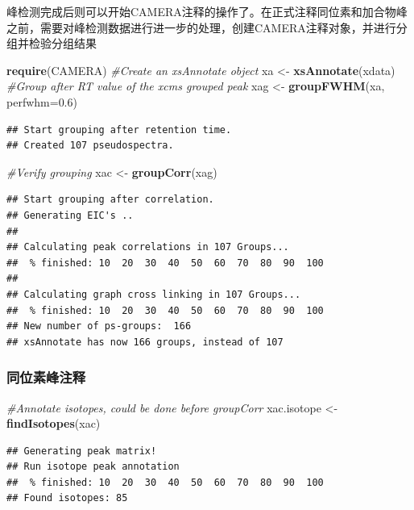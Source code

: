 \documentclass[]{ctexbook}
\newenvironment{Shaded}{\begin{snugshade}}{\end{snugshade}}
\newcommand{\CommentTok}[1]{\textcolor[rgb]{0.56,0.35,0.01}{\textit{#1}}}
\newcommand{\DataTypeTok}[1]{\textcolor[rgb]{0.13,0.29,0.53}{#1}}
\newcommand{\FloatTok}[1]{\textcolor[rgb]{0.00,0.00,0.81}{#1}}
\newcommand{\KeywordTok}[1]{\textcolor[rgb]{0.13,0.29,0.53}{\textbf{#1}}}
\newcommand{\NormalTok}[1]{#1}
\newcommand{\StringTok}[1]{\textcolor[rgb]{0.31,0.60,0.02}{#1}}
\begin{document}
峰检测完成后则可以开始CAMERA注释的操作了。在正式注释同位素和加合物峰之前，需要对峰检测数据进行进一步的处理，创建CAMERA注释对象，并进行分组并检验分组结果

\begin{Shaded}
\begin{Highlighting}[]
\KeywordTok{require}\NormalTok{(CAMERA)}
\CommentTok{#Create an xsAnnotate object}
\NormalTok{xa <-}\StringTok{ }\KeywordTok{xsAnnotate}\NormalTok{(xdata)}
\CommentTok{#Group after RT value of the xcms grouped peak}
\NormalTok{xag <-}\StringTok{ }\KeywordTok{groupFWHM}\NormalTok{(xa, }\DataTypeTok{perfwhm=}\FloatTok{0.6}\NormalTok{)}
\end{Highlighting}
\end{Shaded}

\begin{verbatim}
## Start grouping after retention time.
## Created 107 pseudospectra.
\end{verbatim}

\begin{Shaded}
\begin{Highlighting}[]
\CommentTok{#Verify grouping}
\NormalTok{xac <-}\StringTok{ }\KeywordTok{groupCorr}\NormalTok{(xag)}
\end{Highlighting}
\end{Shaded}

\begin{verbatim}
## Start grouping after correlation.
## Generating EIC's .. 
## 
## Calculating peak correlations in 107 Groups... 
##  % finished: 10  20  30  40  50  60  70  80  90  100  
## 
## Calculating graph cross linking in 107 Groups... 
##  % finished: 10  20  30  40  50  60  70  80  90  100  
## New number of ps-groups:  166 
## xsAnnotate has now 166 groups, instead of 107
\end{verbatim}

\subsubsection{同位素峰注释}

\begin{Shaded}
\begin{Highlighting}[]
\CommentTok{#Annotate isotopes, could be done before groupCorr}
\NormalTok{xac.isotope <-}\StringTok{ }\KeywordTok{findIsotopes}\NormalTok{(xac)}
\end{Highlighting}
\end{Shaded}

\begin{verbatim}
## Generating peak matrix!
## Run isotope peak annotation
##  % finished: 10  20  30  40  50  60  70  80  90  100  
## Found isotopes: 85
\end{verbatim}
\end{document}
